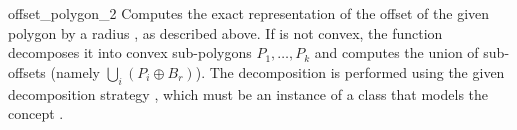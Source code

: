 \begin{ccRefFunction}{offset_polygon_2}
   {Computes the exact representation of the offset of the given polygon
     by a radius , as described above.
    If  is not convex, the function decomposes it into convex
    sub-polygons $P_1, \ldots, P_k$ and computes the union of sub-offsets
    (namely $\bigcup_{i}{(P_i \oplus B_r)}$).
    The decomposition is performed using the given decomposition strategy
    , which must be an instance of a class that models the
    concept .
    }

\end{ccRefFunction}

\ccRefPageEnd
